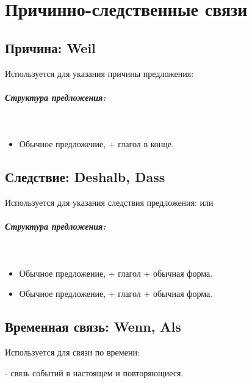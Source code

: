 \chapter{Причинно-следственные связи}

\section{Причина: Weil}

Используется для указания причины предложения: 

\paragraph{Структура предложения:} ~\\
\begin{itemize}
\item Обычное предложение,  + глагол в конце.
\end{itemize}

\section{Следствие: Deshalb, Dass}

Используется для указания следствия предложения:  или 

\paragraph{Структура предложения:} ~\\
\begin{itemize}
\item Обычное предложение,  + глагол + обычная форма.
\item Обычное предложение,  + глагол + обычная форма.
\end{itemize}

\section{Временная связь: Wenn, Als}

Используется для связи по времени:

 - связь событий в настоящем и повторяющиеся. 

